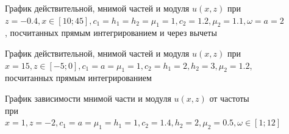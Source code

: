 \documentclass[a4paper, 12pt]{article}
\begin{document}
\begin{figure}[h!]
\noindent{}
\caption{График действительной, мнимой частей и модуля $u(x,z)$ при $z=-0.4, x \in [10;45], c_1=h_1=h_2=\mu_1=1, c_2=1.2,\mu_2=1.1,\omega=a=2$, посчитанных прямым интегрированием и через вычеты}
\label{figCurves}
\end{figure}

\begin{figure}[h!]
\noindent{}
\caption{График действительной, мнимой частей и модуля $u(x,z)$ при $x=15, z \in [-5;0], c_1=a=\mu_1=1, c_2=h_1=2, h_2=3, \mu_2=1.2$, посчитанных прямым интегрированием}
\label{figCurves}
\end{figure}

\begin{figure}[h!]
\noindent{}
            \caption{График зависимости мнимой части и модуля $u(x,z)$ от частоты при $x=1, z=-2, c_1=a=\mu_1=h_1=1, c_2=1.4, h_2=2, \mu_2=0.5, \omega \in [1;12]$}
            \label{figCurves}
            \end{figure}  
            
\end{document}
